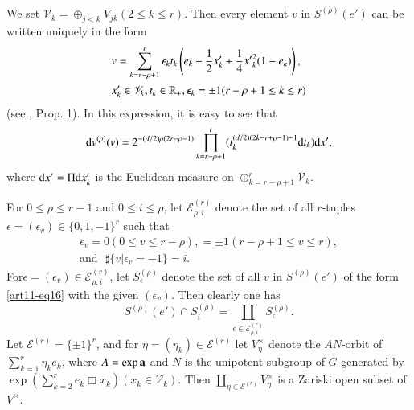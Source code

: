 \section{}\label{art11-sec4}
We set $\mathscr{V}_{k}=\oplus_{j<k}V_{jk}(2\leq k\leq r)$. Then every element $v$ in $S^{(\rho)}(e')$ can be written uniquely in the form
\begin{align}
& v=\sum\limits^{r}_{k=r-\rho+1}\epsilon_{k}t_{k}\left(e_{k}+\frac{1}{2}x'_{k}+\frac{1}{4}{x'}^{2}_{k}(1-e_{k})\right),\label{art11-eq16}\\
& x'_{k}\in \mathscr{V}_{k}, t_{k}\in \mathbb{R}_{+},\epsilon_{k}=\pm 1(r-\rho+1\leq k\leq r)\notag
\end{align}
(see \cite{art11-keyS3}, Prop. 1). In this expression, it is easy to see that
\begin{equation}
\mathrm{d} v^{(\rho)}(v)=2^{-(d/2)\rho(2r-\rho-1)}\prod\limits^{r}_{k=r-\rho+1}(t_{k}^{(d/2)(2k-r+\rho-1)-1}\mathrm{d} t_{k})\mathrm{d} x',\label{art11-eq17}
\end{equation}
where $\mathrm{d} x'=\Pi \mathrm{d} x'_{k}$ is the Euclidean measure on $\oplus^{r}_{k=r-\rho+1}\mathscr{V}_{k}$.

For $0\leq \rho\leq r-1$ and $0\leq i\leq \rho$, let $\mathscr{E}^{(r)}_{\rho,i}$ denote the set of all $r$-tuples $\epsilon=(\epsilon_{v})\in \{0,1,-1\}^{r}$ such that
\begin{gather*}
\epsilon_{v}=0(0\leq v\leq r-\rho), =\pm 1(r-\rho+1\leq v\leq r),\\
\text{and~~} \sharp \{v|\epsilon_{v}=-1\}=i.
\end{gather*}
For\pageoriginale $\epsilon=(\epsilon_{v})\in \mathscr{E}^{(r)}_{\rho,i}$, let $S^{(\rho)}_{\epsilon}$ denote the set of all $v$ in $S^{(\rho)}(e')$ of the form \eqref{art11-eq16} with the given $(\epsilon_{v})$. Then clearly one has
$$
S^{(\rho)}(e')\cap S^{(\rho)}_{i}=\coprod\limits_{\epsilon\in \mathscr{E}^{(r)}_{\rho,i}}S^{(\rho)}_{\epsilon}.
$$
Let $\mathscr{E}^{(r)}=\{\pm 1\}^{r}$, and for $\eta=(\eta_{k})\in \mathscr{E}^{(r)}$ let $V^{\times}_{\eta}$ denote the $AN$-orbit of $\sum^{r}_{k=1}\eta_{k}e_{k}$, where $A=\exp \mathbf{a}$ and $N$ is the unipotent subgroup of $G$ generated by $\exp (\sum^{r}_{k=2}e_{k}\Box x_{k})(x_{k}\in \mathscr{V}_{k})$. Then $\coprod\limits_{\eta\in \mathscr{E}^{(r)}}V_{\eta}^{\times}$ is a Zariski open subset of $V^{\times}$.

